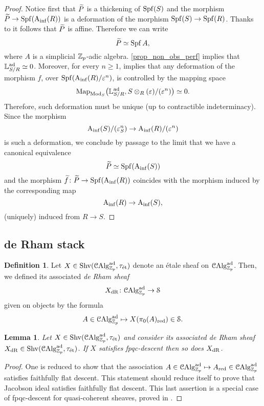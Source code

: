 \documentclass[10pt,a4paper]{amsart}
\numberwithin{equation}{subsection}
\newtheorem{lemma}[theorem]{Lemma}
\theoremstyle{definition}
\newtheorem{definition}[theorem]{Definition}
\begin{document}
\begin{proof} Notice first that $\widetilde{P}$ is a thickening of $\operatorname{Spf}(S)$ and the morphism $\widetilde{P} \to \operatorname{Spf}(\mathrm{A}_{\mathrm{inf}}(R))$ is a deformation of the morphism $\operatorname{Spf}(S) \to \operatorname{Spf}(R)$.
    Thanks to \cite[\href{https://stacks.math.columbia.edu/tag/06AD}{Tag 06AD}]{stacks-project} it follows that $\widetilde{P}$ is affine. Therefore we can write
        \[
            \widetilde{P} \simeq \operatorname{Spf} A,
        \]
    where $A$ is a simplicial $\mathbb Z_p$-adic algebra. \cref{prop_non_obs_perf} implies that $\mathbb{L}^{\mathrm{ad}}_{S/ R} \simeq 0$. Moreover, for every $n \geq 1$, \cite[Theorem 8.4.2.7]{Lurie_Higher_algebra} implies that any deformation of the morphism $f$, over $\operatorname{Spf}(\mathrm{A}_{\mathrm{inf}}(R)/\varepsilon^n)$, is controlled by the mapping space
        \[
                \mathrm{Map}_{\mathrm{Mod}_S} \big(\mathbb{L}^{\mathrm{ad}}_{S/R}, S \otimes_R ( \varepsilon)/(\varepsilon^n) \big) \simeq 0.
        \]  
    Therefore, such deformation must be unique (up to contractible indeterminacy). Since the morphism
        \[
            \mathrm{A}_{\mathrm{inf}}(S)/(\varepsilon_S^n) \to \mathrm{A}_{\mathrm{inf}}(R)/(\varepsilon^n)
        \]
    is such a deformation, we conclude by passage to the limit that we have a canonical equivalence
        \[
                \widetilde{P} \simeq \operatorname{Spf}(\mathrm{A}_{\mathrm{inf}}(S))  
        \]
    and the morphism $\widetilde{f} \colon \widetilde{P} \to \operatorname{Spf}(\mathrm{A}_{\mathrm{inf}}(R))$ coincides with the morphism induced by the corresponding map
        \[
                \mathrm{A}_{\mathrm{inf}}(R) \to \mathrm{A}_{\mathrm{inf}}(S),
        \]
    (uniquely) induced from $R \to S$.
\end{proof}


\subsection{de Rham stack}

\begin{definition}
    Let $X \in \mathrm{Shv}(\mathcal C \mathrm{Alg}^{\mathrm{ad}}_{\mathbb Z_p}, \tau_{\text{\'et}})$ denote an \'etale sheaf on $\mathcal C \mathrm{Alg}^{\mathrm{ad}}_{\mathbb Z_p}$. Then, we defined its associated \emph{de Rham sheaf} 
        \[
            X_{\mathrm{dR}} \colon \mathcal C \mathrm{Alg}^{\mathrm{ad}}_{\mathbb Z_p} \to \mathcal S
        \]  
    given on objects by the formula
        \[
            A \in \mathcal C \mathrm{Alg}^{\mathrm{ad}}_{\mathbb Z_p} \mapsto X(\pi_0(A)_{\mathrm{red}}) \in \mathcal S. 
        \]
\end{definition}

\begin{lemma}
    Let $X \in \mathrm{Shv}(\mathcal C \mathrm{Alg}^{\mathrm{ad}}_{\mathbb Z_p}, \tau_{\text{\'et}})$ and consider its associated de Rham sheaf $X_{\mathrm{dR}} \in \mathrm{Shv}(\mathcal C \mathrm{Alg}^{\mathrm{ad}}_{\mathbb Z_p}, \tau_{\text{\'et}})$. If $X$ satisfies fpqc-descent then so does $X_{\mathrm{dR}}$.
\end{lemma}

\begin{proof}
    One is reduced to show that the association $A \in \mathcal C \mathrm{Alg}^{\mathrm{ad}}_{\mathbb Z_p} \mapsto A_{\mathrm{red}} \in \mathcal C \mathrm{Alg}^{\mathrm{ad}}_{\mathbb Z_p}$ satisfies faithfully flat descent. This statement should reduce itself to prove that Jacobson ideal satisfies faithfully flat descent. This last assertion is a special case of fpqc-descent for quasi-coherent sheaves, proved in \cite[\href{https://stacks.math.columbia.edu/tag/023R}{Tag 023R}]{stacks-project}. 
\end{proof}
\end{document}
